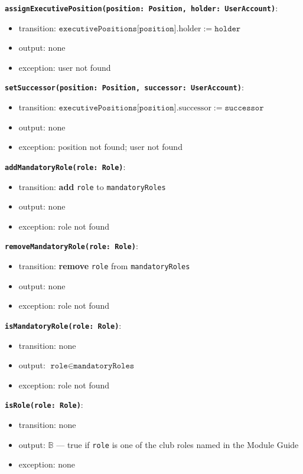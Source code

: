 \documentclass[12pt, titlepage]{article}
\begin{document}
\textbf{\texttt{assignExecutivePosition(position: Position, holder: UserAccount)}}:
\begin{itemize}
  \item transition: $\texttt{executivePositions[position]}.\text{holder} := \texttt{holder}$
  \item output: none
  \item exception: user not found
\end{itemize}

\textbf{\texttt{setSuccessor(position: Position, successor: UserAccount)}}:
\begin{itemize}
  \item transition: $\texttt{executivePositions[position]}.\text{successor} := \texttt{successor}$
  \item output: none
  \item exception: position not found; user not found
\end{itemize}

\textbf{\texttt{addMandatoryRole(role: Role)}}:
\begin{itemize}
  \item transition: \textbf{add} \texttt{role} to \texttt{mandatoryRoles}
  \item output: none
  \item exception: role not found
\end{itemize}

\textbf{\texttt{removeMandatoryRole(role: Role)}}:
\begin{itemize}
  \item transition: \textbf{remove} \texttt{role} from \texttt{mandatoryRoles}
  \item output: none
  \item exception: role not found
\end{itemize}

\textbf{\texttt{isMandatoryRole(role: Role)}}:
\begin{itemize}
  \item transition: none
  \item output: $\texttt{role} \in \texttt{mandatoryRoles}$
  \item exception: role not found
\end{itemize}

\textbf{\texttt{isRole(role: Role)}}:
\begin{itemize}
  \item transition: none
  \item output: $\mathbb{B}$ --- true if \texttt{role} is one of the club roles named in the Module Guide
  \item exception: none
\end{itemize}
\end{document}
